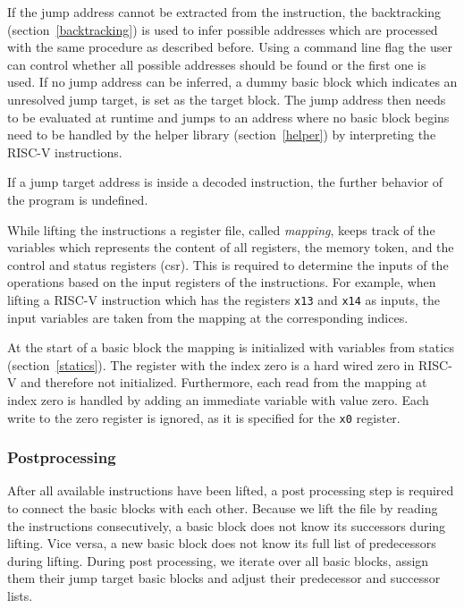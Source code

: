 \documentclass[course=eragp]{aspdoc}
\begin{document}
\par

If the jump address cannot be extracted from the instruction, the backtracking (section~\ref{backtracking})
is used to infer possible addresses which are processed with the same procedure as described before.
Using a command line flag the user can control whether all possible
addresses should be found or the first one is used. If no jump address can be inferred, a dummy
basic block which indicates an unresolved jump target, is set as the target block. The jump address then
needs to be evaluated at runtime and jumps to an address where no basic block begins need to be
handled by the helper library (section~\ref{helper}) by interpreting the RISC-V instructions.

\par

If a jump target address is inside a decoded instruction, the further behavior of the program is undefined.

\par

While lifting the instructions a register file, called \emph{mapping}, keeps track of the variables
which represents the content of all registers, the memory token, and the control and status registers
(csr). This is required to determine the inputs of the operations based on the input registers of
the instructions. For example, when lifting a RISC-V instruction which has the registers \texttt{x13}
and \texttt{x14} as inputs, the input variables are taken from the mapping at the corresponding
indices.

\par

At the start of a basic block the mapping is initialized
with variables from statics (section~\ref{statics}). The register with the index zero is a hard wired zero in
RISC-V and therefore not initialized. Furthermore, each read from the mapping at index zero is handled by adding an immediate
variable with value zero. Each write to the zero register is ignored, as it is specified for the \texttt{x0}
register.\cite{rvspec}

\subsubsection{Postprocessing}

After all available instructions have been lifted, a post processing step is required to connect
the basic blocks with each other. Because we lift the file by reading the instructions
consecutively, a basic block does not know its successors during lifting. Vice versa, a new basic
block does not know its full list of predecessors during lifting.
During post processing, we iterate over all basic blocks, assign them their jump target basic
blocks and adjust their predecessor and successor lists.
\end{document}
